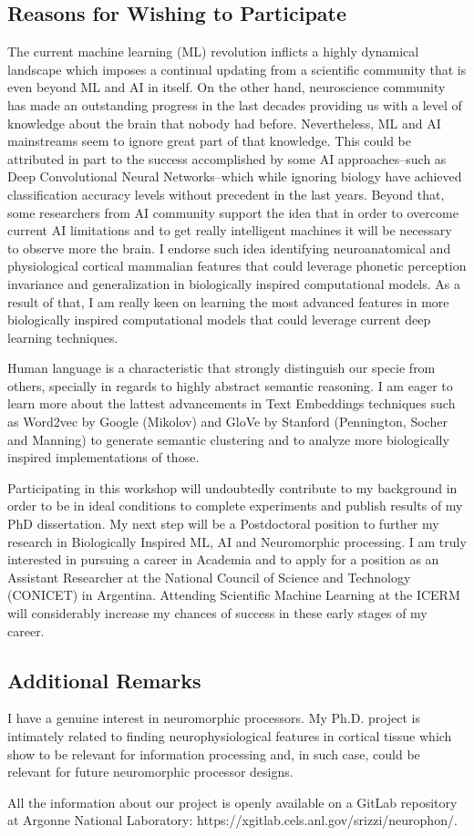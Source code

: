 \documentclass{article}
\begin{document}
\subsection*{Reasons for Wishing to Participate}
The current machine learning (ML) revolution inflicts a highly dynamical landscape which imposes a continual updating from a scientific community that is even beyond ML and AI in itself. On the other hand, neuroscience community has made an outstanding progress in the last decades providing us with a level of knowledge about the brain that nobody had before. Nevertheless, ML and AI mainstreams seem to ignore great part of that knowledge. This could be attributed in part to the success accomplished by some AI approaches–such as Deep Convolutional Neural Networks–which while ignoring biology have achieved classification accuracy levels without precedent in the last years. Beyond that, some researchers from AI community support the idea that in order to overcome current AI limitations and to get really intelligent machines it will be necessary to observe more the brain. I endorse such idea identifying neuroanatomical and physiological cortical mammalian features that could leverage phonetic perception invariance and generalization in biologically inspired computational models. As a result of that, I am really keen on learning the most advanced features in more biologically inspired computational models that could leverage current deep learning techniques.

Human language is a characteristic that strongly distinguish our specie from others, specially in regards to highly abstract semantic reasoning. I am eager to learn more about the lattest advancements in Text Embeddings techniques such as Word2vec by Google (Mikolov) and GloVe by Stanford (Pennington, Socher and Manning) to generate semantic clustering and to analyze more biologically inspired implementations of those.

Participating in this workshop will undoubtedly contribute to my background in order to be in ideal conditions to complete experiments and publish results of my PhD dissertation. My next step will be a Postdoctoral position to further my research in Biologically Inspired ML, AI and Neuromorphic processing. I am truly interested in pursuing a career in Academia and to apply for a position as an Assistant Researcher at the National Council of Science and Technology (CONICET) in Argentina. Attending Scientific Machine Learning at the ICERM will considerably increase my chances of success in these early stages of my career.

\subsection*{Additional Remarks}
I have a genuine interest in neuromorphic processors. My Ph.D. project is intimately related to finding neurophysiological features in cortical tissue which show to be relevant for information processing and, in such case, could be relevant for future neuromorphic processor designs.

All the information about our project is openly available on a GitLab repository at Argonne National Laboratory: https://xgitlab.cels.anl.gov/srizzi/neurophon/.
\end{document}
